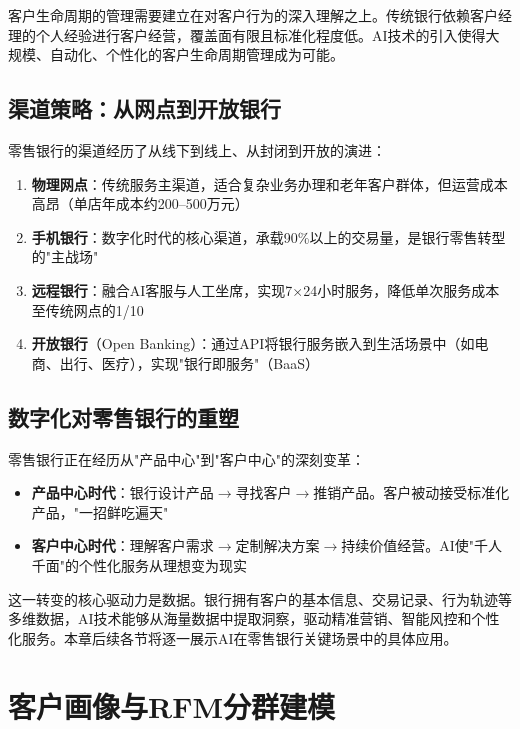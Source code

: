 客户生命周期的管理需要建立在对客户行为的深入理解之上。传统银行依赖客户经理的个人经验进行客户经营，覆盖面有限且标准化程度低。AI技术的引入使得大规模、自动化、个性化的客户生命周期管理成为可能。

\subsection{渠道策略：从网点到开放银行}

零售银行的渠道经历了从线下到线上、从封闭到开放的演进：

\begin{enumerate}[leftmargin=2em]
  \item \textbf{物理网点}：传统服务主渠道，适合复杂业务办理和老年客户群体，但运营成本高昂（单店年成本约200--500万元）
  \item \textbf{手机银行}：数字化时代的核心渠道，承载90\%以上的交易量，是银行零售转型的"主战场"
  \item \textbf{远程银行}：融合AI客服与人工坐席，实现7$\times$24小时服务，降低单次服务成本至传统网点的1/10
  \item \textbf{开放银行}（Open Banking）：通过API将银行服务嵌入到生活场景中（如电商、出行、医疗），实现"银行即服务"（BaaS）
\end{enumerate}

\subsection{数字化对零售银行的重塑}

零售银行正在经历从"产品中心"到"客户中心"的深刻变革：

\begin{itemize}[leftmargin=2em]
  \item \textbf{产品中心时代}：银行设计产品$\rightarrow$寻找客户$\rightarrow$推销产品。客户被动接受标准化产品，"一招鲜吃遍天"
  \item \textbf{客户中心时代}：理解客户需求$\rightarrow$定制解决方案$\rightarrow$持续价值经营。AI使"千人千面"的个性化服务从理想变为现实
\end{itemize}

这一转变的核心驱动力是数据。银行拥有客户的基本信息、交易记录、行为轨迹等多维数据，AI技术能够从海量数据中提取洞察，驱动精准营销、智能风控和个性化服务。本章后续各节将逐一展示AI在零售银行关键场景中的具体应用。

\section{客户画像与RFM分群建模}

